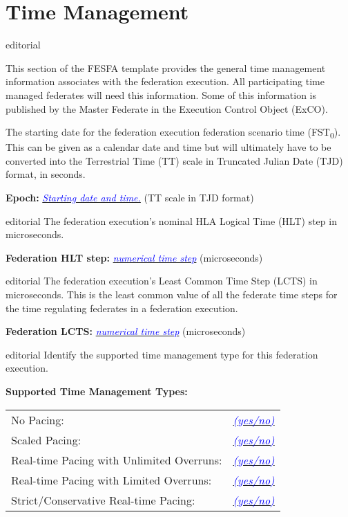 \documentclass[11pt,english,letterpaper]{article}
\newcommand{\example}[1]{{\textcolor{blue}{\textit{#1}}}}
\begin{document}
\section*{Time Management}

\begin{shownto}{editorial}
{\color{red} This section of the FESFA template provides the general time
management information associates with the federation execution. All
participating time managed federates will need this information. Some of this
information is published by the Master Federate in the Execution Control Object
(ExCO).

The starting date for the federation execution federation scenario time (FST\textsubscript{0}).
This can be given as a calendar date and time but will ultimately have to be
converted into the Terrestrial Time (TT) scale in Truncated Julian Date (TJD)
format, in seconds.}
\end{shownto}

\textbf{Epoch: } \underline{\example{Starting date and time.}} (TT scale in TJD format)

\begin{shownto}{editorial}
{\color{red} The federation execution's nominal HLA Logical Time (HLT) step in
microseconds.}
\end{shownto}

\textbf{Federation HLT step: } \underline{\example{numerical time step}} (microseconds)

\begin{shownto}{editorial}
{\color{red} The federation execution's Least Common Time Step (LCTS) in
microseconds. This is the least common value of all the federate time steps for
the time regulating federates in a federation execution.}
\end{shownto}

\textbf{Federation LCTS: }  \underline{\example{numerical time step}} (microseconds)

\begin{shownto}{editorial}
{\color{red} Identify the supported time management type for this federation execution.}
\end{shownto}

\textbf{Supported Time Management Types: }

\hspace{0.25in}
\begin{tabular}{ll}
No Pacing:                                & \underline{\example{(yes/no)}} \\
Scaled Pacing:                            & \underline{\example{(yes/no)}} \\
Real-time Pacing with Unlimited Overruns: & \underline{\example{(yes/no)}} \\
Real-time Pacing with Limited Overruns:   & \underline{\example{(yes/no)}} \\
Strict/Conservative Real-time Pacing:     & \underline{\example{(yes/no)}} \\
\end{tabular}
\end{document}
